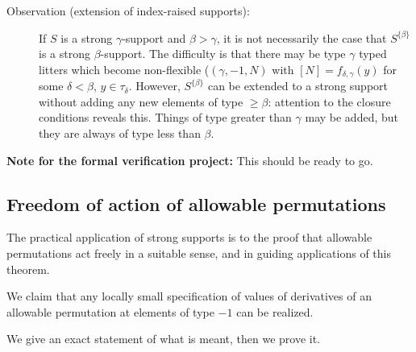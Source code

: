 \documentclass[112pt]{article}
\begin{document}
\begin{description}
\item[Observation (extension of index-raised supports):]  If $S$ is a strong $\gamma$-support and $\beta>\gamma$, it is not necessarily the case
that $S^{\{\beta\}}$ is a strong $\beta$-support.  The difficulty is that there may be type $\gamma$ typed litters which become non-flexible ($(\gamma,-1,N)$ with $[N] = f_{\delta,\gamma}(y)$ for some $\delta<\beta$, $y \in \tau_\delta$.  However, $S^{\{\beta\}}$ can be extended to a strong support without adding any new elements of type $\geq \beta$:  attention to the closure conditions reveals this.  Things of type greater than $\gamma$ may be added, but they are always of type less than $\beta$.

\end{description}

{\bf Note for the formal verification project:}  This should be ready to go.
\newpage
\subsection{Freedom of action of allowable permutations}

The practical application of strong supports is to the proof that allowable permutations act freely in a suitable sense, and in guiding applications of this theorem.

We claim that any locally small specification of values of derivatives of an allowable permutation at elements of type $-1$ can be realized.

We give an exact statement of what is meant, then we prove it.
\end{document}
